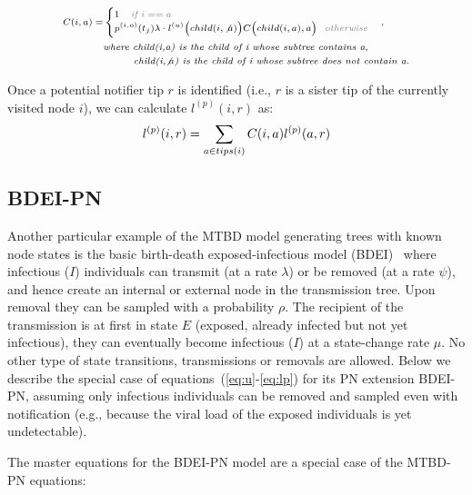 \documentclass[a4paper,10pt]{article}
\begin{document}
\begin{equation}
\scriptsize
\begin{split}
C(i,a) = &\begin{cases}
1 \textit{\color{gray}~~~if $i == a$}
\\
p^{(i,o)}(t_j) \lambda \cdot l^{(u)}\Big(child(i, \not a)\Big)C\Big(child(i, a),a\Big) \textit{\color{gray}~~otherwise}\\ 
\end{cases},
\\ &\textit{where child(i,a) is the child of i whose subtree contains a},
\\
 &\textit{~~~~~~~~child(i,$\not a$) is the child of i whose subtree does not contain a.}
\end{split}
\end{equation}

Once a potential notifier tip $r$ is identified (i.e., $r$ is a sister tip of the currently visited node $i$), we can calculate $l^{(p)}(i, r)$ as:
\begin{equation}
\scriptsize 
l^{(p)}(i, r) = \sum\limits_{a \in tips(i)}C(i, a) l^{(p)}(a, r)
\end{equation}




\subsection{BDEI-PN}
Another particular example of the MTBD model generating trees with known node states is the basic birth-death exposed-infectious model (BDEI)~\citep{Stadler2014} where   infectious ($I$) individuals can transmit (at a rate $\lambda$) or be removed (at a rate $\psi$), and hence create an internal or external node in the transmission tree. Upon removal they can be sampled with a probability $\rho$. The recipient of the transmission is at first in state $E$ (exposed, already infected but not yet infectious), they can eventually become infectious ($I$) at a state-change rate $\mu$. No other type of state transitions, transmissions or removals are allowed. Below we describe the special case of equations~(\ref{eq:u}-\ref{eq:lp}) for its PN extension BDEI-PN, assuming only infectious individuals can be removed and sampled even with notification (e.g., because the viral load of the exposed individuals is yet undetectable).


The master equations for the BDEI-PN model are a special case of the MTBD-PN equations:
\end{document}
